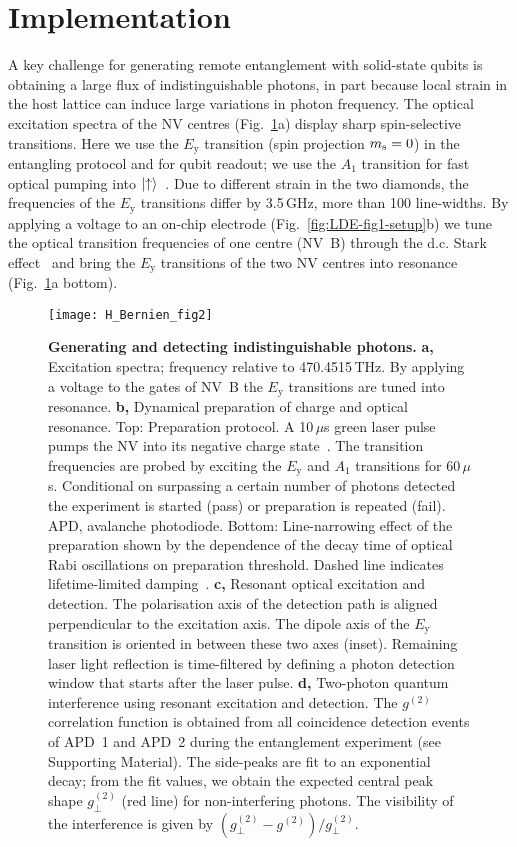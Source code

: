 \section{Implementation}

A key challenge for generating remote entanglement with solid-state qubits is obtaining a large flux of indistinguishable photons, in part because local strain in the host lattice can induce large variations in photon frequency. The optical excitation spectra of the NV centres (Fig.~\ref{fig:LDE-fig2}a) display sharp spin-selective transitions. Here we use the $E_\text{y}$ transition (spin projection $m_\mathrm s = 0$) in the entangling protocol and for qubit readout; we use the $A_1$ transition for fast optical pumping into $\left|\uparrow\right\rangle$~\cite{Robledo2011}. Due to different strain in the two diamonds, the frequencies of the $E_\text{y}$ transitions differ by 3.5$\,$GHz, more than 100 line-widths. By applying a voltage to an on-chip electrode (Fig.~\ref{fig:LDE-fig1-setup}b) we tune the optical transition frequencies of one centre (NV~B) through the d.c. Stark effect~\cite{Bernien2012a,Bassett2011a} and bring the $E_\text{y}$ transitions of the two NV centres into resonance (Fig.~\ref{fig:LDE-fig2}a bottom).

\begin{figure}[tp]
	\centering
	\texttt{[image: H\_Bernien\_fig2]}
	\caption{\label{fig:LDE-fig2} \textbf{Generating and detecting indistinguishable photons.}
	\textbf{a,} Excitation spectra; frequency relative to 470.4515$\,$THz. By applying a voltage to the gates of NV~B the $E_\text{y}$ transitions are tuned into resonance. 
	\textbf{b,} Dynamical preparation of charge and optical resonance. Top: Preparation protocol. A 10$\,\mu$s green laser pulse pumps the NV into its negative charge state~\cite{Robledo2011}. The transition frequencies are probed by exciting the $E_\text{y}$ and $A_\text{1}$ transitions for 60$\,\mu$s. Conditional on surpassing a certain number of photons detected the experiment is started (pass) or preparation is repeated (fail). APD, avalanche photodiode. Bottom: Line-narrowing effect of the preparation shown by the dependence of the decay time of optical Rabi oscillations on preparation threshold. Dashed line indicates lifetime-limited damping~\cite{Robledo2010}. 
	\textbf{c,} Resonant optical excitation and detection. The polarisation axis of the detection path is aligned perpendicular to the excitation axis. The dipole axis of the $E_\text{y}$ transition is oriented in between these two axes (inset). Remaining laser light reflection is time-filtered by defining a photon detection window that starts after the laser pulse. 
	\textbf{d,} Two-photon quantum interference using resonant excitation and detection. The $g^{(2)}$ correlation function is obtained from all coincidence detection events of APD~1 and APD~2 during the entanglement experiment (see Supporting Material). The side-peaks are fit to an exponential decay; from the fit values, we obtain the expected central peak shape $g_\perp^{(2)}$ (red line) for non-interfering photons. The visibility of the interference is given by $(g_\perp^{(2)}-g^{(2)})/g_\perp^{(2)}$.}
\end{figure}

